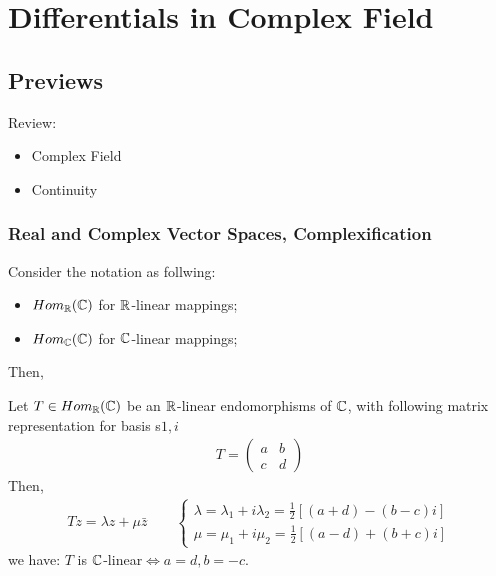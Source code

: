 \documentclass[Total.tex]{subfiles}
\begin{document}
	\chapter{Differentials in Complex Field}
		\section{Previews}
			Review:
			\begin{itemize}
				\item Complex Field
				\item Continuity
			\end{itemize}
			\subsection{Real and Complex Vector Spaces, Complexification}
				Consider the notation as follwing: 
				\begin{itemize}
					\item $Hom_{\mathbb{R}}(\mathbb{C})$ for $\mathbb{R}$-linear mappings;
					\item $Hom_{\mathbb{C}}(\mathbb{C})$ for $\mathbb{C}$-linear mappings;
				\end{itemize}
				Then,
				\begin{lemma}
					Let $T\in Hom_{\mathbb{R}}(\mathbb{C})$ be an $\mathbb{R}$-linear endomorphisms of $\mathbb{C}$, with following matrix representation for basis s$1,i$
					\begin{gather*}
						T=\begin{pmatrix}
							a&b\\
							c&d
						\end{pmatrix}
					\end{gather*}
					Then, 
					\begin{gather*}
						Tz=\lambda z+\mu \bar{z}\qquad\begin{cases}	\lambda=\lambda_1+i\lambda_2=\frac{1}{2}[(a+d)-(b-c)i]\\
							\mu=\mu_1+i\mu_2=\frac{1}{2}[(a-d)+(b+c)i]
						\end{cases}
					\end{gather*}
					we have: $T$ is $\mathbb{C}$-linear$\Leftrightarrow a=d,b=-c$.
				\end{lemma}
\end{document}
